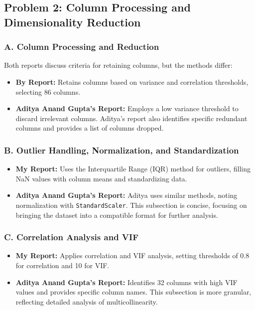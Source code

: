 \subsection*{Problem 2: Column Processing and Dimensionality Reduction}

\subsubsection*{A. Column Processing and Reduction}
Both reports discuss criteria for retaining columns, but the methods differ:
\begin{itemize}
    \item \textbf{By Report:} Retains columns based on variance and correlation thresholds, selecting 86 columns.
    \item \textbf{Aditya Anand Gupta's Report:} Employs a low variance threshold to discard irrelevant columns. Aditya’s report also identifies specific redundant columns and provides a list of columns dropped.
\end{itemize}

\subsubsection*{B. Outlier Handling, Normalization, and Standardization}
\begin{itemize}
    \item \textbf{My Report:} Uses the Interquartile Range (IQR) method for outliers, filling NaN values with column means and standardizing data.
    \item \textbf{Aditya Anand Gupta's Report:} Aditya uses similar methods, noting normalization with \texttt{StandardScaler}. This subsection is concise, focusing on bringing the dataset into a compatible format for further analysis.
\end{itemize}

\subsubsection*{C. Correlation Analysis and VIF}
\begin{itemize}
    \item \textbf{My Report:} Applies correlation and VIF analysis, setting thresholds of 0.8 for correlation and 10 for VIF.
    \item \textbf{Aditya Anand Gupta's Report:} Identifies 32 columns with high VIF values and provides specific column names. This subsection is more granular, reflecting detailed analysis of multicollinearity.
\end{itemize}

